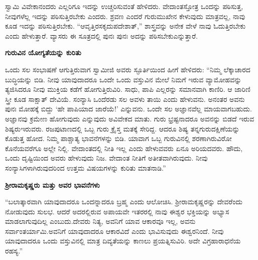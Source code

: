 ಸ್ವಾಮಿ ವಿವೇಕಾನಂದರು ಎಲ್ಲರಿಗೂ ಇದನ್ನು ಉಚ್ಚರಿಸುವಂತೆ ಹೇಳಿದರು. ವೇದಾಂತಸ್ತೋತ್ರ ಒಂದನ್ನು ಪಠಿಸುತ್ತ, ನೀವುಗಳೆಲ್ಲ ಇದನ್ನು ಪಠಿಸುತ್ತಿರಬೇಕು ಎಂದರು. ಶ್ರವಣ ಎಂದರೆ ಗುರುಮುಖೇನ ಕೇಳುವುದು ಮಾತ್ರವಲ್ಲ, ನಾವು ಕೂಡ ಇದನ್ನು ಪಠಿಸುತ್ತಿರಬೇಕು. “ಆವೃತ್ತಿರಸಕೃದುಪದೇಶಾತ್​,” ಶಾಸ್ತ್ರವನ್ನು ಅನೇಕ ವೇಳೆ ನಾವು ಓದುತ್ತಿರಬೇಕು ಎಂದು ಹೇಳುತ್ತಾರೆ. ವ್ಯಾಸರು ಈ ಸೂತ್ರದಲ್ಲಿ ಪುನಃ ಪುನಃ ಅದನ್ನು ಪಠಿಸಬೇಕು\break ಎನ್ನುತ್ತಾರೆ.

\centerline{\textbf{ಗುರುವಿನ ಯೋಗ್ಯತೆಯನ್ನು ಕುರಿತು}}

ಒಂದು ಸಲ ಸಂಭಾಷಣೆ ಆಗುತ್ತಿರುವಾಗ ಸ್ವಾಮೀಜಿ ಅವರು ಸ್ಫೂರ್ತಿಯಿಂದ ಹೀಗೆ ಹೇಳಿದರು: “ನಿಮ್ಮ ಲೆಕ್ಕಾಚಾರದ ಬುದ್ಧಿಯನ್ನು ಬಿಡಿ. ನೀವು ಯಾವುದಾದರೂ ಒಂದೇ ಒಂದು ವಸ್ತುವಿನ ಮೇಲೆ ನಿಮಗೆ ಇರುವ ವ್ಯಾಮೋಹವನ್ನು ತ್ಯಜಿಸಿದರೂ ನೀವು ಮುಕ್ತಿಯ ಕಡೆಗೆ ಹೋಗುತ್ತಿರುವಿರಿ. ಸಾಧು, ಪಾಪಿ ಎಲ್ಲರನ್ನು ಸಮಾನವಾಗಿ ಕಾಣಿರಿ. ಆ ಜಾರಿಣಿ ಸ್ತ್ರೀ ಕೂಡ ಸಾಕ್ಷಾತ್​ ದೇವಿಯೆ. ಸಂನ್ಯಾಸಿ ಒಂದೆರಡು ಸಲ ಅವಳು ತಾಯಿ ಎಂದು ಹೇಳುವನು. ಅನಂತರ ಅವನು ಪುನಃ ಮೋಹಕ್ಕೆ ಬಿದ್ದು ‘ಹೇ ಪಾಪಿಯಾದ ಜಾರೆಯೆ!’ ಎನ್ನುವನು. ಒಂದೇ ಸಲ ಅಜ್ಞಾನವೆಲ್ಲ ಮಾಯವಾಗಬಹುದು. ಅಜ್ಞಾನವು ಕ್ರಮೇಣ ಹೋಗುವುದು ಎನ್ನುವುದು ಅವಿವೇಕದ ಮಾತು. ಗುರು ಭ್ರಷ್ಟನಾದರೂ ಅವನನ್ನು ಬಿಡದೆ ಇರುವ ಶಿಷ್ಯರು\break ಇರುವರು. ರಜಪುಟಾಣದಲ್ಲಿ ಒಬ್ಬ ಗುರು ಕ್ರೈಸ್ತ ಮತಕ್ಕೆ ಸೇರಿದ್ದ. ಆದರೂ ಶಿಷ್ಯ ತನ್ನ\break ಗುರುದಕ್ಷಿಣೆಯನ್ನು ಕೊಡುತ್ತ ಹೋದ. ನಿಮ್ಮ ಪಾಶ್ಚಾತ್ಯ ಭಾವನೆಗಳನ್ನು ಬಿಡಿ. ಯಾವಾಗ ಒಬ್ಬ ಗುರುವಿನಲ್ಲಿ ಶರಣಾಗಿರುವಿರೋ ಕೊನೆಯವರೆಗೂ ಅಲ್ಲೇ ನಿಲ್ಲಿ. ವೇದಾಂತದಲ್ಲಿ ನೀತಿ ಇಲ್ಲ ಎಂದು ಹೇಳುವವರು ಏನೂ ಅರಿಯದವರು. ಹೌದು, ಒಂದು ದೃಷ್ಟಿಯಿಂದ ಅವರು ಹೇಳುವುದು ನಿಜ. ವೇದಾಂತ ನೀತಿಗೆ ಅತೀತವಾಗಿರುವುದು. ನೀವು ಸಂನ್ಯಾಸಿಗಳಾಗಿರುವುದರಿಂದ ಉತ್ತಮ ವಿಷಯಗಳನ್ನು ಕುರಿತು ಮಾತನಾಡಿ.”

\vskip 5pt

\centerline{\textbf{ಶ‍್ರೀರಾಮಕೃಷ್ಣರು ಮತ್ತು ಅವರ ಭಾವನೆಗಳು}}

\vskip 5pt

“ಬಲಾತ್ಕಾರವಾಗಿ ಯಾವುದಾದರೂ ಒಂದನ್ನಾದರೂ ಬ್ರಹ್ಮ ಎಂದು ಆಲೋಚಿಸಿ. ಶ‍್ರೀರಾಮಕೃಷ್ಣರನ್ನು ದೇವರೆಂದು ನೋಡುವುದು ಸುಲಭ. ಆದರೆ ಅದರಲ್ಲಿರುವ ಅಪಾಯವೇ ಇತರರಲ್ಲಿ ನಾವು ಈಶ್ವರ ಭಕ್ತಿಯನ್ನು ಅಭ್ಯಾಸ ಮಾಡಲಾಗುವುದಿಲ್ಲ ಎಂಬುದು.\break ದೇವರು ನಿತ್ಯ, ಅವನಿಗೆ ಯಾವ ಆಕಾರವೂ ಇಲ್ಲ, ಅವನು ಸರ್ವಾಂತರ್ಯಾಮಿ.\break ಅವನಿಗೆ ಯಾವುದಾದರೂ ಆಕಾರವಿದೆ ಎಂದು ಭಾವಿಸುವುದು ಈಶ್ವರನಿಂದೆ. ನೀವು ಯಾವುದಾದರೂ ಒಂದು ವಸ್ತುವಿನಲ್ಲಿ ಮಾತ್ರ ದಿವ್ಯತೆಯನ್ನು ಕಾಣಲು ಪ್ರಯತ್ನಿಸುವಿರಿ. ಅದೇ ವಿಗ್ರಹಾರಾಧನೆಯ ರಹಸ್ಯ.”

\vskip 5pt

